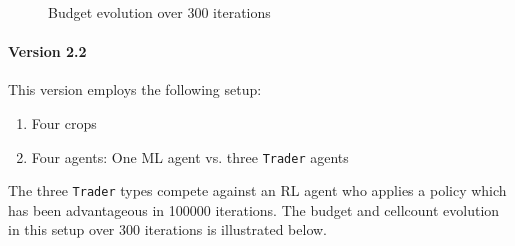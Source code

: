 \documentclass[a4paper,12pt]{article} %
\begin{document}

\begin{figure}[H]
    \centering
    {
	  }
    \caption{Budget evolution over 300 iterations}
    \label{fig:budget MLvsIntros}
\end{figure}


\newpage
\paragraph{Version 2.2}
This version employs the following setup:
\begin{enumerate}
    \item Four crops
    \item Four agents: One ML agent vs. three \texttt{Trader} agents
\end{enumerate}

The three \texttt{Trader} types compete against an RL agent who applies a policy which has been advantageous in 100000 iterations. The budget and cellcount evolution in this setup over 300 iterations is illustrated below.



\end{document}
